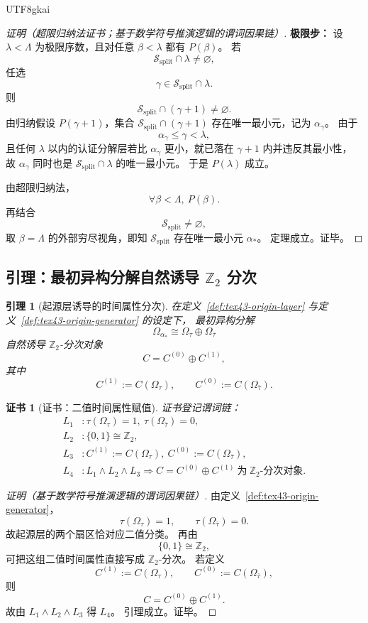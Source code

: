 \documentclass[12pt]{article}
\newtheorem{lemma}{引理}[section]
\newtheorem{Certificate}{证书}[section]
\newcommand{\Ztwo}{\mathbb{Z}_2}
\begin{document}
\begin{CJK*}{UTF8}{gkai}
\begin{proof}[证明（超限归纳法证书；基于数学符号推演逻辑的谓词因果链）]
\textbf{极限步：}
设 $\lambda<\Lambda$ 为极限序数，且对任意 $\beta<\lambda$ 都有 $P(\beta)$。
若
\[
  \mathcal S_{\mathrm{split}}\cap\lambda\neq\varnothing,
\]
任选
\[
  \gamma\in \mathcal S_{\mathrm{split}}\cap\lambda.
\]
则
\[
  \mathcal S_{\mathrm{split}}\cap(\gamma+1)\neq\varnothing.
\]
由归纳假设 $P(\gamma+1)$，集合 $\mathcal S_{\mathrm{split}}\cap(\gamma+1)$ 存在唯一最小元，记为 $\alpha_\gamma$。
由于
\[
  \alpha_\gamma\le \gamma<\lambda,
\]
且任何 $\lambda$ 以内的认证分解层若比 $\alpha_\gamma$ 更小，就已落在 $\gamma+1$ 内并违反其最小性，
故 $\alpha_\gamma$ 同时也是 $\mathcal S_{\mathrm{split}}\cap\lambda$ 的唯一最小元。
于是 $P(\lambda)$ 成立。

由超限归纳法，
\[
  \forall\beta<\Lambda,\ P(\beta).
\]
再结合
\[
  \mathcal S_{\mathrm{split}}\neq\varnothing,
\]
取 $\beta=\Lambda$ 的外部穷尽视角，即知 $\mathcal S_{\mathrm{split}}$ 存在唯一最小元 $\alpha_\ast$。
定理成立。证毕。
\end{proof}

\subsection{引理：最初异构分解自然诱导 \texorpdfstring{$\Ztwo$}{Z2} 分次}
\label{subsec:tex43-ch4-lemma}

\begin{lemma}[起源层诱导的时间属性分次]
\label{lem:tex43-origin-z2}
在定义~\ref{def:tex43-origin-layer} 与定义~\ref{def:tex43-origin-generator} 的设定下，
最初异构分解
\[
  \Omega_{\alpha_\ast}\cong \Omega_\tau\oplus \Omega_{\bar\tau}
\]
自然诱导 \(\Ztwo\)-分次对象
\[
  C=C^{(0)}\oplus C^{(1)},
\]
其中
\[
  C^{(1)}:=C(\Omega_\tau),
  \qquad
  C^{(0)}:=C(\Omega_{\bar\tau}).
\]
\end{lemma}

\begin{Certificate}[证书：二值时间属性赋值]
\label{cert:tex43-origin-z2}
证书登记谓词链：
\[
\begin{aligned}
  L_1 &: \tau(\Omega_\tau)=1,\ \tau(\Omega_{\bar\tau})=0,\\
  L_2 &: \{0,1\}\cong \Ztwo,\\
  L_3 &: C^{(1)}:=C(\Omega_\tau),\ C^{(0)}:=C(\Omega_{\bar\tau}),\\
  L_4 &: L_1\wedge L_2\wedge L_3 \Rightarrow C=C^{(0)}\oplus C^{(1)}\ \text{为}\ \Ztwo\text{-分次对象}.
\end{aligned}
\]
\end{Certificate}

\begin{proof}[证明（基于数学符号推演逻辑的谓词因果链）]
由定义~\ref{def:tex43-origin-generator}，
\[
  \tau(\Omega_\tau)=1,
  \qquad
  \tau(\Omega_{\bar\tau})=0.
\]
故起源层的两个扇区恰对应二值分类。
再由
\[
  \{0,1\}\cong \Ztwo,
\]
可把这组二值时间属性直接写成 \(\Ztwo\)-分次。
若定义
\[
  C^{(1)}:=C(\Omega_\tau),
  \qquad
  C^{(0)}:=C(\Omega_{\bar\tau}),
\]
则
\[
  C=C^{(0)}\oplus C^{(1)}.
\]
故由 $L_1\wedge L_2\wedge L_3$ 得 $L_4$。
引理成立。证毕。
\end{proof}


\end{CJK*}
\end{document}

